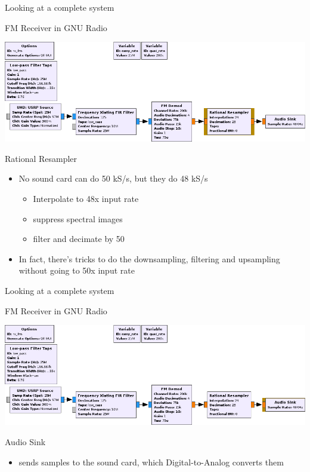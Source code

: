 \documentclass{beamer}
\begin{document}
\begin{frame}{Looking at a complete system}

  FM Receiver in GNU Radio \bigskip

  {\includegraphics[width=\textwidth]{fg_resampler}}

  Rational Resampler

  {\begin{itemize}
    \item No sound card can do 50 kS/s, but they do 48 kS/s
      \begin{itemize}
        \item Interpolate to 48x input rate
        \item suppress spectral images
        \item filter and decimate by 50
      \end{itemize}
    \item In fact, there's tricks to do the downsampling, filtering and upsampling without going to 50x input rate
  \end{itemize}}



\end{frame}
\begin{frame}{Looking at a complete system}

  FM Receiver in GNU Radio \bigskip

  {\includegraphics[width=\textwidth]{fg_audio_sink}}

  Audio Sink
  
  \begin{itemize}
    \item sends samples to the sound card, which Digital-to-Analog converts them
  \end{itemize}

\end{frame}
\end{document}
